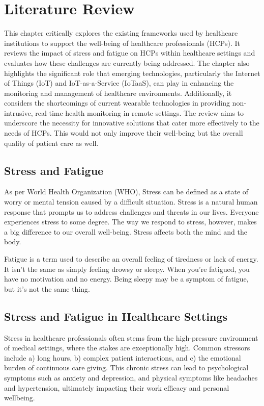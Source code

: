 \newpage
\chapter{Literature Review}

This chapter critically explores the existing frameworks used by healthcare institutions to support the well-being of healthcare professionals (HCPs). It reviews the impact of stress and fatigue on HCPs within healthcare settings and evaluates how these challenges are currently being addressed. The chapter also highlights the significant role that emerging technologies, particularly the Internet of Things (IoT) and IoT-as-a-Service (IoTaaS), can play in enhancing the monitoring and management of healthcare environments. Additionally, it considers the shortcomings of current wearable technologies in providing non-intrusive, real-time health monitoring in remote settings. The review aims to underscore the necessity for innovative solutions that cater more effectively to the needs of HCPs. This would not only improve their well-being but the overall quality of patient care as well.

\section{Stress and Fatigue}

As per World Health Organization (WHO), Stress can be defined as a state of worry or mental tension caused by a difficult situation. Stress is a natural human response that prompts us to address challenges and threats in our lives. Everyone experiences stress to some degree. The way we respond to stress, however, makes a big difference to our overall well-being. Stress affects both the mind and the body. \cite{48} 

Fatigue is a term used to describe an overall feeling of tiredness or lack of energy. It isn’t the same as simply feeling drowsy or sleepy. When you’re fatigued, you have no motivation and no energy. Being sleepy may be a symptom of fatigue, but it’s not the same thing. \cite{49}

\section{Stress and Fatigue in Healthcare Settings}
Stress in healthcare professionals often stems from the high-pressure environment of medical settings, where the stakes are exceptionally high. Common stressors include a) long hours, b) complex patient interactions, and c) the emotional burden of continuous care giving. This chronic stress can lead to psychological symptoms such as anxiety and depression, and physical symptoms like headaches and hypertension, ultimately impacting their work efficacy and personal wellbeing. \\ 

